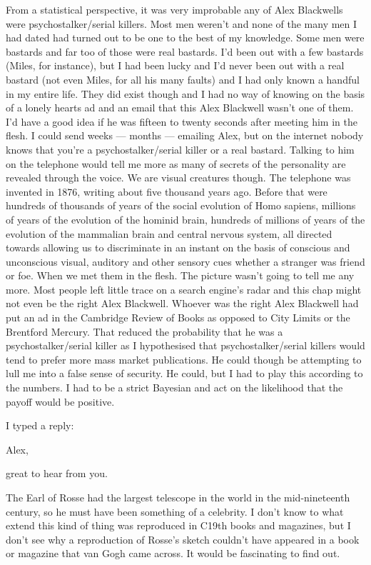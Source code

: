 From a statistical perspective, it was very improbable any of Alex
Blackwells were psychostalker/serial killers. Most men weren't and
none of the many men I had dated had turned out to be one to the
best of my knowledge. Some men were bastards and far too of those
were {\twelveit real\/} bastards. I'd been out with a few bastards
(Miles, for instance), but I had been lucky and I'd never been out
with a real bastard (not even Miles, for all his many faults) and I
had only known a handful in my entire life. They did exist though
and I had no way of knowing on the basis of a lonely hearts ad and
an email that this Alex Blackwell wasn't one of them. I'd have a
good idea if he was fifteen to twenty seconds after meeting him in
the flesh. I could send weeks --- months --- emailing Alex, but on
the internet nobody knows that you're a psychostalker/serial killer
or a real bastard. Talking to him on the telephone would tell me
more as many of secrets of the personality are revealed through the
voice. We are visual creatures though. The telephone was invented in
1876, writing about five thousand years ago. Before that were
hundreds of thousands of years of the social evolution of {\twelveit
Homo sapiens\/}, millions of years of the evolution of the hominid brain,
hundreds of millions of years of the evolution of the mammalian
brain and central nervous system, all directed towards allowing us
to discriminate in an instant on the basis of conscious and
unconscious visual, auditory and other sensory cues whether a
stranger was friend or foe. When we met them in the flesh. The
picture wasn't going to tell me any  more. Most people left little
trace on a search engine's radar and this chap might not even be the right
Alex Blackwell. Whoever was the right Alex Blackwell had put an ad
in the {\twelvesl Cambridge Review of Books\/} as opposed to
{\twelvesl City Limits\/} or the {\twelvesl Brentford Mercury}. That
reduced the probability that he was a psychostalker/serial killer as
I hypothesised that psychostalker/serial killers would tend to
prefer more mass market publications. He could though be attempting
to lull me into a false sense of security. He could, but I had to
play this according to the numbers. I had to be a strict Bayesian
and act on the likelihood that the payoff would be positive.

I typed a reply:

\startmessage
Alex,

great to hear from you.

The Earl of Rosse had the largest telescope in the world in the
mid-nineteenth century, so he must have been something of a
celebrity. I don't know to what extend this kind of thing was
reproduced in C19th books and magazines, but I don't see why a
reproduction of Rosse's sketch couldn't have appeared in a book or
magazine that van Gogh came across. It would be fascinating to find
out.

